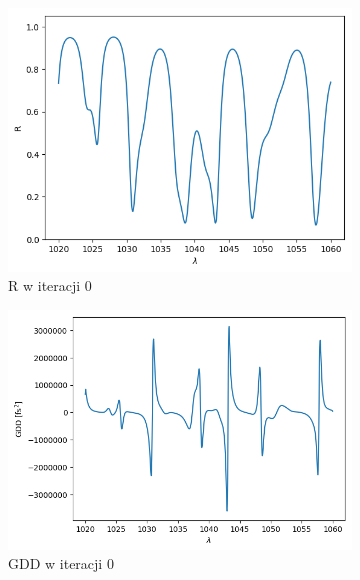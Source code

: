 \begin{figure} [H]
    \centering
    \begin{subfigure}[b]{0.30\textwidth}
        \includegraphics[width=\linewidth]{figures/wyniki/losowe/d/result_Rresult0.png}
        \caption{R w iteracji 0}
    \end{subfigure}
            \begin{subfigure}[b]{0.31\textwidth}
        \includegraphics[width=\linewidth]{figures/wyniki/losowe/d/result_gddresult0.png}
        \caption{GDD w iteracji 0}
    \end{subfigure}
            \begin{subfigure}[b]{0.32\textwidth}

\end{subfigure}
\end{figure}
